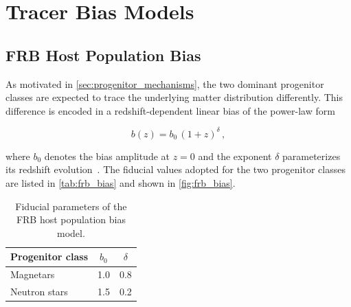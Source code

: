 \section{Tracer Bias Models} \label{sec:bias_models}

\subsection{FRB Host Population Bias} \label{sec:frb_bias}


As motivated in \autoref{sec:progenitor_mechanisms}, the two dominant progenitor classes are expected
to trace the underlying matter distribution differently. 
This difference is encoded in a redshift-dependent linear bias of the power-law form

\begin{equation}\label{eq:frb_bias}
    b(z) = b_0 \, (1+z)^{\delta} \,,
\end{equation}

where $b_0$ denotes the bias amplitude at $z=0$ and the exponent $\delta$ parameterizes its redshift
evolution~\cite{Pan_2020}. The fiducial values adopted for the two progenitor classes are listed
in \autoref{tab:frb_bias} and shown in \autoref{fig:frb_bias}.

\begin{table}[H]
    \centering
    \vspace{-5pt} %
    \caption{Fiducial parameters of the FRB host population bias model.}
    \label{tab:frb_bias}
    \begin{tabular}{
        l@{\hspace{1.2em}}
        S[table-format=1.1]
        @{\hspace{1.0em}}
        S[table-format=1.1]
    }
        \toprule
        Progenitor class & {$b_0$} & {$\delta$} \\
        \midrule
        Magnetars      & 1.0 & 0.8 \\
        Neutron stars  & 1.5 & 0.2 \\
        \bottomrule
    \end{tabular}
\end{table}

